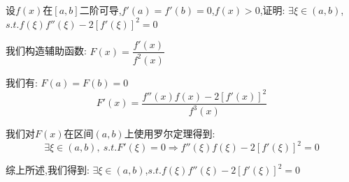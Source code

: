 
\begin{proposition}
	设$f(x)$在$[a,b]$二阶可导,$f'(a)=f'(b)=0$,$f(x)>0$,证明: $\exists \xi\in(a,b)$,$s.t. f(\xi)f''(\xi)-2[f'(\xi)]^2=0$
\end{proposition}
\begin{solution}

	我们构造辅助函数: $F(x)=\dfrac{f'(x)}{f^{2}(x)}$

	我们有: $F(a)=F(b)=0$
	$$F'(x)=\dfrac{f''(x)f(x)-2[f'(x)]^2}{f^{3}(x)}$$

	我们对$F(x)$在区间$(a,b)$上使用罗尔定理得到:
	$$\exists \xi\in(a,b),\ s.t. F'(\xi)=0\Rightarrow f''(\xi)f(\xi)-2[f'(\xi)]^2=0$$

	综上所述,我们得到: $\exists \xi\in(a,b)$,$s.t. f(\xi)f''(\xi)-2[f'(\xi)]^2=0$
\end{solution}


